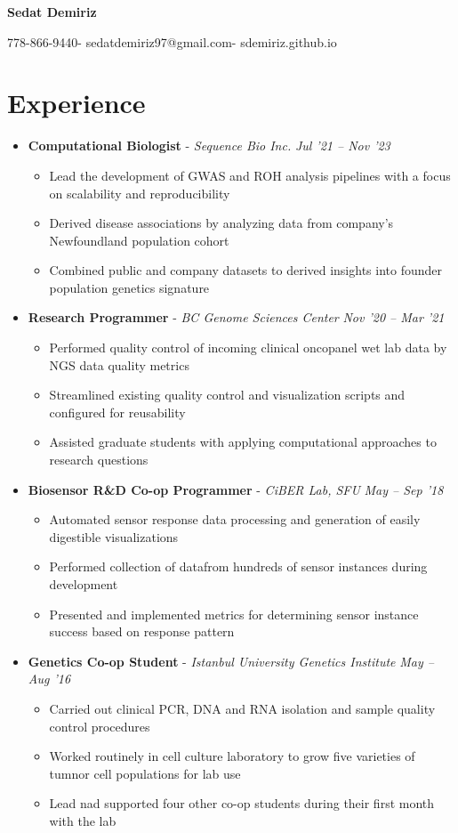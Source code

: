 \documentclass{article}
\makeatletter
\newcommand{\name}{Sedat Demiriz}
\newcommand{\email}{sedatdemiriz97@gmail.com}
\newcommand{\phone}{778-866-9440}
\newcommand{\website}{sdemiriz.github.io}
\newcommand{\customitem}{\item[] \hspace{-.85cm}}
\newcommand{\experienceheader}[3]{\customitem \textbf{#1} - \textit{#2} \hfill \textit{#3}}
\newcommand{\customsection}[1]{\section*{#1} \vspace{-.3cm} \hrulefill}
\makeatother
\begin{document}
\begin{minipage}[t]{1\textwidth} 
  \centering \Huge 
  \textbf{\name} \vspace{.5cm} 
\end{minipage}
\begin{minipage}[t]{1\textwidth} 
  \centering \normalsize 
  \phone \hspace{.1cm}-\hspace{.1cm} \email \hspace{.1cm}-\hspace{.1cm} \website 
\end{minipage}

\customsection{Experience}
\begin{itemize}
    \experienceheader{Computational Biologist}{Sequence Bio Inc.}{Jul '21 -- Nov '23}
    \begin{itemize}
      \customitem Lead the development of GWAS and ROH analysis pipelines with a focus on scalability and reproducibility
      \customitem Derived disease associations by analyzing data from company's Newfoundland population cohort
      \customitem Combined public and company datasets to derived insights into founder population genetics signature
    \end{itemize}
  \experienceheader{Research Programmer}{BC Genome Sciences Center}{Nov '20 -- Mar '21}
    \begin{itemize}
      \customitem Performed quality control of incoming clinical oncopanel wet lab data by NGS data quality metrics
      \customitem Streamlined existing quality control and visualization scripts and configured for reusability
      \customitem Assisted graduate students with applying computational approaches to research questions
    \end{itemize}
  \experienceheader{Biosensor R\&D Co-op Programmer}{CiBER Lab, SFU}{May -- Sep '18}
    \begin{itemize}
      \customitem Automated sensor response data processing and generation of easily digestible visualizations
      \customitem Performed collection of datafrom hundreds of sensor instances during development
      \customitem Presented and implemented metrics for determining sensor instance success based on response pattern
    \end{itemize}
  \experienceheader{Genetics Co-op Student}{Istanbul University Genetics Institute}{May -- Aug '16}
    \begin{itemize}
      \customitem Carried out clinical PCR, DNA and RNA isolation and sample quality control procedures
      \customitem Worked routinely in cell culture laboratory to grow five varieties of tumnor cell populations for lab use
      \customitem Lead nad supported four other co-op students during their first month with the lab
    \end{itemize}
\end{itemize}
\end{document}

